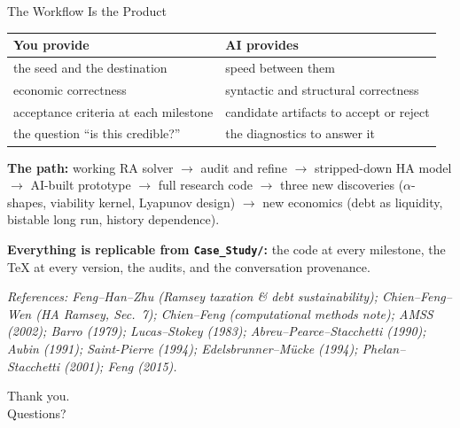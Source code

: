 \documentclass[10pt,aspectratio=169]{beamer}
\newcommand{\compacttables}{\renewcommand{\arraystretch}{1.15}}
\begin{document}
\begin{frame}{The Workflow Is the Product}
\compacttables
\begin{center}\footnotesize
\renewcommand{\arraystretch}{1.0}
\begin{tabular}{p{5.6cm}p{6.3cm}}
\toprule
\textbf{You provide} & \textbf{AI provides} \\
\midrule
the seed and the destination & speed between them \\
economic correctness & syntactic and structural correctness \\
acceptance criteria at each milestone & candidate artifacts to accept or reject \\
the question ``is this credible?'' & the diagnostics to answer it \\
\bottomrule
\end{tabular}
\end{center}

\smallskip
\begin{block}{}
\small \textbf{The path:} working RA solver $\to$ audit and refine $\to$ stripped-down HA model
$\to$ AI-built prototype $\to$ full research code $\to$ three new discoveries
($\alpha$-shapes, viability kernel, Lyapunov design) $\to$ new economics
(debt as liquidity, bistable long run, history dependence).
\end{block}

\smallskip
{\small\textbf{Everything is replicable from \texttt{Case\_Study/}:} the code at every
milestone, the TeX at every version, the audits, and the conversation provenance.}

\smallskip
\scriptsize\textit{References: Feng--Han--Zhu (Ramsey taxation \& debt sustainability);
Chien--Feng--Wen (HA Ramsey, Sec.~7); Chien--Feng (computational methods note);
AMSS (2002); Barro (1979); Lucas--Stokey (1983); Abreu--Pearce--Stacchetti (1990);
Aubin (1991); Saint-Pierre (1994); Edelsbrunner--M\"ucke (1994); Phelan--Stacchetti (2001); Feng (2015).}
\end{frame}

\begin{frame}[standout]
  Thank you.\\[6mm]
  Questions?
\end{frame}

\appendix
\end{document}

